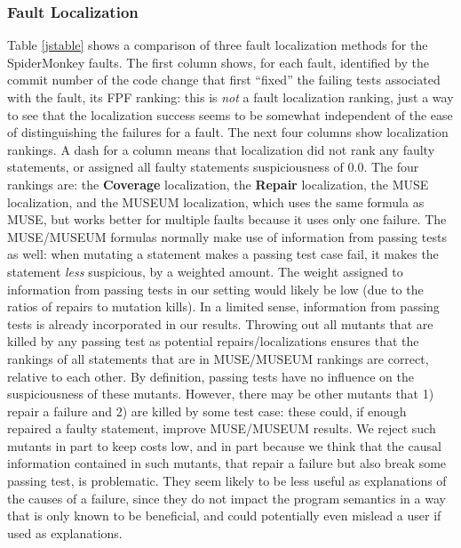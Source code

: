 \subsubsection{Fault Localization}

Table \ref{jstable} shows a comparison of three fault localization methods for the SpiderMonkey faults.  The first column shows, for each fault, identified by the commit number of the code change that first ``fixed'' the failing tests associated with the fault, its FPF ranking: this is \emph{not} a fault localization ranking, just a way to see that the localization success seems to be somewhat independent of the ease of distinguishing the failures for a fault.  The next four columns show localization rankings.  A dash for a column means that localization did not rank any faulty statements, or assigned all faulty statements suspiciousness of 0.0.  The four rankings are: the {\bf Coverage} localization, the {\bf Repair} localization, the MUSE \cite{MUSE} localization, and the MUSEUM \cite{multilingual} localization, which uses the same formula as MUSE, but works better for multiple faults because it uses only one failure.  The MUSE/MUSEUM formulas normally make use of information from passing tests as well: when mutating a statement makes a passing test case fail, it makes the statement \emph{less} suspicious, by a weighted amount. The weight assigned to information from passing tests in our setting would likely be low (due to the ratios of repairs to mutation kills).  In a limited sense, information from passing tests is already incorporated in our results.  Throwing out all mutants that are killed by any passing test as potential repairs/localizations ensures that the rankings of all statements that are in MUSE/MUSEUM rankings are correct, relative to each other.  By definition, passing tests have no influence on the suspiciousness of these mutants.  However, there may be other mutants that 1) repair a failure and 2) are killed by some test case: these could, if enough repaired a faulty statement, improve MUSE/MUSEUM results.  We reject such mutants in part to keep costs low, and in part because we think that the causal information contained in such mutants, that repair a failure but also break some passing test, is problematic.  They seem likely to be less useful as explanations of the causes of a failure, since they do not impact the program semantics in a way that is only known to be beneficial, and could potentially even mislead a user if used as explanations.

